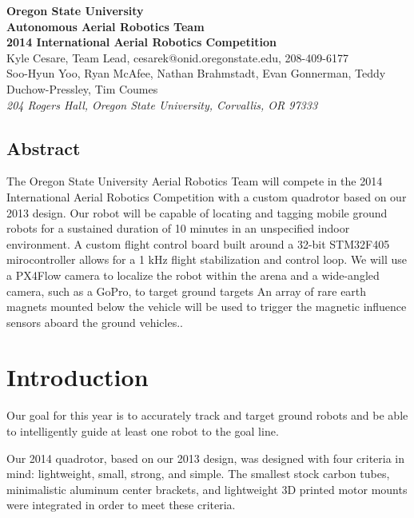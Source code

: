 \documentclass[12pt,letterpaper]{article} \usepackage[margin=1in]{geometry}
\begin{document}
\begin{center}
	{\bf\Large Oregon State University \\
		Autonomous Aerial Robotics Team \\
		2014 International Aerial Robotics Competition \\ [1em]
	}
	{\footnotesize Kyle Cesare, Team Lead, cesarek@onid.oregonstate.edu, 208-409-6177 \\
		Soo-Hyun Yoo, Ryan McAfee, Nathan Brahmstadt, Evan Gonnerman, Teddy Duchow-Pressley, Tim Coumes  \\ [0.5em]
		\emph{204 Rogers Hall, Oregon State University, Corvallis, OR 97333}
	}
\end{center}


\begin{center} \begin{minipage}{5.5in}

\section*{Abstract}

The Oregon State University Aerial Robotics Team will compete in the 2014
International Aerial Robotics Competition with a custom quadrotor based on our
2013 design. Our robot will be capable of locating and tagging mobile ground
robots for a sustained duration of 10 minutes in an unspecified indoor
environment. A custom flight control board built around a 32-bit STM32F405
mirocontroller allows for a 1 kHz flight stabilization and control loop. We will
use a PX4Flow camera to localize the robot within the arena and a wide-angled
camera, such as a GoPro, to target ground targets An array of rare earth magnets
mounted below the vehicle will be used to trigger the magnetic influence sensors
aboard the ground vehicles..

\end{minipage} \end{center}



\section*{Introduction}

Our goal for this year is to accurately track and target ground robots and be
able to intelligently guide at least one robot to the goal line.

Our 2014 quadrotor, based on our 2013 design, was designed with four criteria in
mind: lightweight, small, strong, and simple. The smallest stock carbon tubes,
minimalistic aluminum center brackets, and lightweight 3D printed motor mounts
were integrated in order to meet these criteria.
\end{document}
